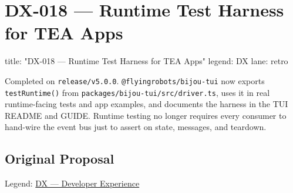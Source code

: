 \chapter{DX-018 --- Runtime Test Harness for TEA Apps}\label{record-328}

\smallskip

\begin{RecordMeta}
title: "DX-018 — Runtime Test Harness for TEA Apps"
legend: DX
lane: retro

\end{RecordMeta}

Completed on \texttt{r\allowbreak{}e\allowbreak{}l\allowbreak{}e\allowbreak{}a\allowbreak{}s\allowbreak{}e\allowbreak{}/\allowbreak{}v\allowbreak{}5\allowbreak{}.\allowbreak{}0\allowbreak{}.\allowbreak{}0}. \texttt{@\allowbreak{}f\allowbreak{}l\allowbreak{}y\allowbreak{}i\allowbreak{}n\allowbreak{}g\allowbreak{}r\allowbreak{}o\allowbreak{}b\allowbreak{}o\allowbreak{}t\allowbreak{}s\allowbreak{}/\allowbreak{}b\allowbreak{}i\allowbreak{}j\allowbreak{}o\allowbreak{}u\allowbreak{}-\allowbreak{}t\allowbreak{}u\allowbreak{}i} now exports \texttt{t\allowbreak{}e\allowbreak{}s\allowbreak{}t\allowbreak{}R\allowbreak{}u\allowbreak{}n\allowbreak{}t\allowbreak{}i\allowbreak{}m\allowbreak{}e\allowbreak{}(\allowbreak{})} from \texttt{p\allowbreak{}a\allowbreak{}c\allowbreak{}k\allowbreak{}a\allowbreak{}g\allowbreak{}e\allowbreak{}s\allowbreak{}/\allowbreak{}b\allowbreak{}i\allowbreak{}j\allowbreak{}o\allowbreak{}u\allowbreak{}-\allowbreak{}t\allowbreak{}u\allowbreak{}i\allowbreak{}/\allowbreak{}s\allowbreak{}r\allowbreak{}c\allowbreak{}/\allowbreak{}d\allowbreak{}r\allowbreak{}i\allowbreak{}v\allowbreak{}e\allowbreak{}r\allowbreak{}.\allowbreak{}t\allowbreak{}s}, uses it in real runtime-facing tests and app examples, and documents the harness in the TUI README and GUIDE. Runtime testing no longer requires every consumer to hand-wire the event bus just to assert on state, messages, and teardown.

\section{Original Proposal}\label{record-328-original-proposal}

Legend: \href{https://github.com/flyingrobots/bijou/blob/1853ad902f6bf219326409e7f743a5a1d6517dbc/docs/method/legends/DX-developer-experience.md}{DX --- Developer Experience}

